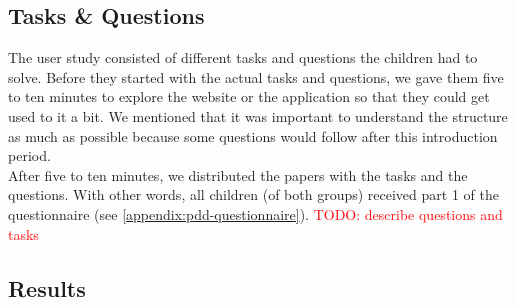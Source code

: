 \subsection{Tasks \& Questions}
The user study consisted of different tasks and questions the children had to solve. Before they started with the actual tasks and questions, we gave them five to ten minutes to explore the website or the application so that they could get used to it a bit. We mentioned that it was important to understand the structure as much as possible because some questions would follow after this introduction period.\\

After five to ten minutes, we distributed the papers with the tasks and the questions. With other words, all children (of both groups) received part 1 of the questionnaire (see \autoref{appendix:pdd-questionnaire}). \textcolor{red}{TODO: describe questions and tasks}\\



\subsection{Results}



